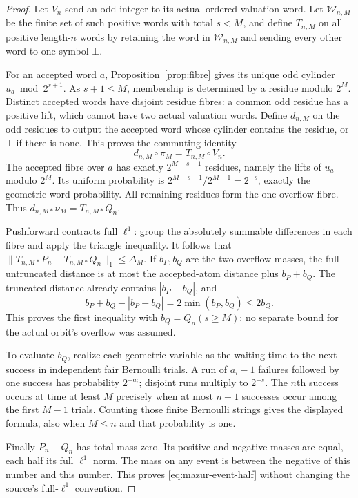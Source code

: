 \documentclass[11pt]{article}
\theoremstyle{remark}\newtheorem{remark}[proposition]{Remark}
\begin{document}
\begin{proof}
Let $V_n$ send an odd integer to its actual ordered valuation word.
Let $\mathcal W_{n,M}$ be the finite set of such positive words with
total $s<M$, and define $T_{n,M}$ on all positive length-$n$ words
by retaining the word in $\mathcal W_{n,M}$ and sending every other
word to one symbol $\bot$.

For an accepted word $a$, Proposition~\ref{prop:fibre} gives its
unique odd cylinder $u_a\bmod2^{s+1}$.
As $s+1\le M$, membership is determined by a residue modulo $2^M$.
Distinct accepted words have disjoint residue fibres: a common odd
residue has a positive lift, which cannot have two actual valuation
words. Define $d_{n,M}$ on the odd residues to output the accepted
word whose cylinder contains the residue, or $\bot$ if there is none.
This proves the commuting identity
\[
 d_{n,M}\circ\pi_M=T_{n,M}\circ V_n.
\]
The accepted fibre over $a$ has exactly $2^{M-s-1}$ residues,
namely the lifts of $u_a$ modulo $2^M$. Its uniform probability is
$2^{M-s-1}/2^{M-1}=2^{-s}$, exactly the geometric word probability.
All remaining residues form the one overflow fibre. Thus
$d_{n,M*}\nu_M=T_{n,M*}Q_n$.

Pushforward contracts full $\ell^1$: group the absolutely summable
differences in each fibre and apply the triangle inequality.
It follows that $\|T_{n,M*}P_n-T_{n,M*}Q_n\|_1\le\Delta_M$.
If $b_P,b_Q$ are the two overflow masses, the full untruncated
distance is at most the accepted-atom distance plus $b_P+b_Q$.
The truncated distance already contains $|b_P-b_Q|$, and
\[
 b_P+b_Q-|b_P-b_Q|=2\min(b_P,b_Q)\le2b_Q.
\]
This proves the first inequality with $b_Q=Q_n(s\ge M)$;
no separate bound for the actual orbit's overflow was assumed.

To evaluate $b_Q$, realize each geometric variable as the waiting
time to the next success in independent fair Bernoulli trials.
A run of $a_i-1$ failures followed by one success has probability
$2^{-a_i}$; disjoint runs multiply to $2^{-s}$.
The $n$th success occurs at time at least $M$ precisely when at most
$n-1$ successes occur among the first $M-1$ trials. Counting those
finite Bernoulli strings gives the displayed formula, also when
$M\le n$ and that probability is one.

Finally $P_n-Q_n$ has total mass zero. Its positive and negative
masses are equal, each half its full $\ell^1$ norm. The mass on
any event is between the negative of this number and this number.
This proves \eqref{eq:mazur-event-half} without changing the
source's full-$\ell^1$ convention.
\end{proof}
\end{document}
